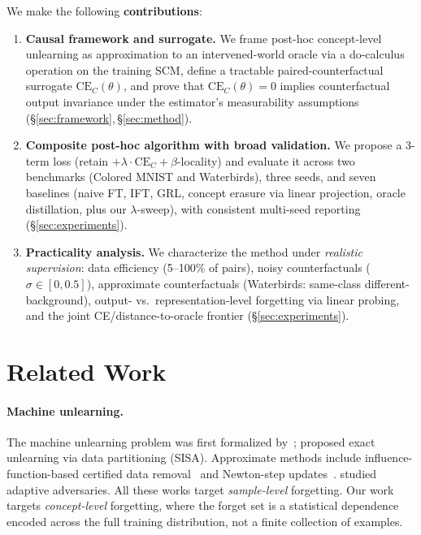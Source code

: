 \documentclass{article}
\newcommand{\CE}{\mathrm{CE}}
\begin{document}
We make the following \textbf{contributions}:
\begin{enumerate}[leftmargin=1.5em]
  \item \textbf{Causal framework and surrogate.}  We frame post-hoc
    concept-level unlearning as approximation to an intervened-world oracle
    via a do-calculus operation on the training SCM, define a tractable
    paired-counterfactual surrogate $\CE_C(\theta)$, and prove that
    $\CE_C(\theta){=}0$ implies counterfactual output invariance under the
    estimator's measurability assumptions (\S\ref{sec:framework},\,\S\ref{sec:method}).
  \item \textbf{Composite post-hoc algorithm with broad validation.}  We
    propose a 3-term loss (retain $+ \lambda\cdot\CE_C + \beta$-locality) and
    evaluate it across two benchmarks (Colored MNIST and Waterbirds), three
    seeds, and seven baselines (naive FT, IFT, GRL, concept erasure via
    linear projection, oracle distillation, plus our $\lambda$-sweep), with
    consistent multi-seed reporting (\S\ref{sec:experiments}).
  \item \textbf{Practicality analysis.}  We characterize the method under
    \emph{realistic supervision}: data efficiency (5--100\% of pairs),
    noisy counterfactuals ($\sigma{\in}[0,0.5]$), approximate
    counterfactuals (Waterbirds: same-class different-background), output- vs.\
    representation-level forgetting via linear probing, and the joint
    CE/distance-to-oracle frontier (\S\ref{sec:experiments}).
\end{enumerate}

\section{Related Work}
\label{sec:related}

\paragraph{Machine unlearning.}
The machine unlearning problem was first formalized by~\citet{cao2015machine};
\citet{bourtoule2021machine} proposed exact unlearning via data partitioning
(SISA).  Approximate methods include influence-function-based certified data
removal~\cite{guo2020certified} and Newton-step
updates~\cite{sekhari2021remember}.  \citet{gupta2021adaptive} studied adaptive
adversaries.  All these works target \emph{sample-level} forgetting.  Our work
targets \emph{concept-level} forgetting, where the forget set is a statistical
dependence encoded across the full training distribution, not a finite collection
of examples.
\end{document}
